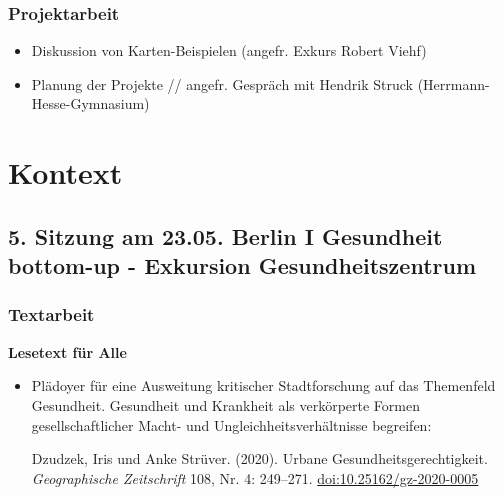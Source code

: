 \documentclass[
  ngerman,
]{article}
\providecommand{\tightlist}{%
  \setlength{\itemsep}{0pt}\setlength{\parskip}{0pt}}
\begin{document}
\hypertarget{projektarbeit-2}{%
\subsubsection*{Projektarbeit}\label{projektarbeit-2}}

\begin{itemize}
\tightlist
\item
  Diskussion von Karten-Beispielen (angefr. Exkurs Robert Viehf)
\item
  Planung der Projekte // angefr. Gespräch mit Hendrik Struck (Herrmann-Hesse-Gymnasium)
\end{itemize}

\hypertarget{kontext}{%
\section*{Kontext}\label{kontext}}

\hypertarget{sitzung-am-23.05.-berlin-i-gesundheit-bottom-up---exkursion-gesundheitszentrum}{%
\subsection*{5. Sitzung am 23.05. \textbar{} Berlin I Gesundheit bottom-up - Exkursion Gesundheitszentrum}\label{sitzung-am-23.05.-berlin-i-gesundheit-bottom-up---exkursion-gesundheitszentrum}}

\hypertarget{textarbeit-4}{%
\subsubsection*{Textarbeit}\label{textarbeit-4}}

\textbf{Lesetext für Alle}

\begin{itemize}
\item
  Plädoyer für eine Ausweitung kritischer Stadtforschung auf das Themenfeld Gesundheit. Gesundheit und Krankheit als verkörperte Formen gesellschaftlicher Macht- und Ungleichheitsverhältnisse begreifen:

  Dzudzek, Iris und Anke Strüver. (2020). Urbane Gesundheitsgerechtigkeit. \emph{Geographische Zeitschrift} 108, Nr. 4: 249--271. \url{doi:10.25162/gz-2020-0005}
\end{itemize}
\end{document}
